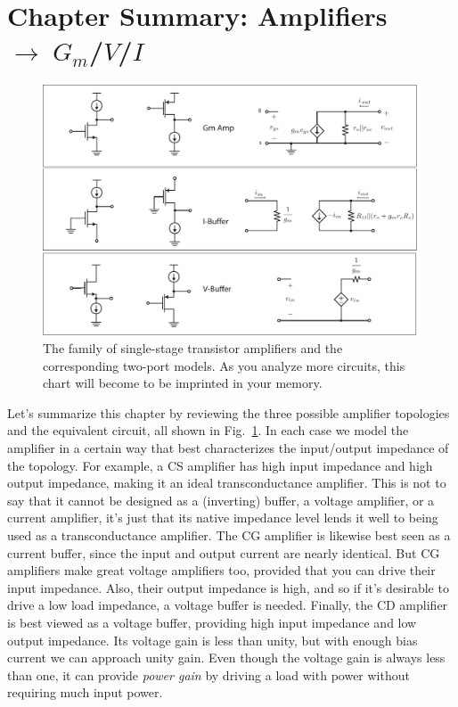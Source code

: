 \section{Chapter Summary: Amplifiers \texorpdfstring{$\rightarrow \; G_m$/$V$/$I$}{}}
\begin{figure}[tb]
\centering
\includegraphics[width=\columnwidth]{ampchart_models}
\caption{The family of single-stage transistor amplifiers and the corresponding two-port models.  As you analyze more circuits, this chart will become to be imprinted in your memory.}
\label{fig:ampchart_models}
\end{figure}
Let's summarize this chapter by reviewing the three possible amplifier topologies and the equivalent circuit, all shown in Fig.~\ref{fig:ampchart_models}.  In each case we model the amplifier in a certain way that best characterizes the input/output impedance of the topology.  For example, a CS amplifier has high input impedance and high output impedance, making it an ideal transconductance amplifier.  This is not to say that it cannot be designed as a (inverting) buffer, a voltage amplifier, or a current amplifier, it's just that its native impedance level lends it well to being used as a transconductance amplifier.  
The CG amplifier is likewise best seen as a current buffer, since the input and output current are nearly identical.  But CG amplifiers make great voltage amplifiers too, provided that you can drive their input impedance.  Also, their output impedance is high, and so if it's desirable to drive a low load impedance, a voltage buffer is needed.  
Finally, the CD amplifier is best viewed as a voltage buffer, providing high input impedance and low output impedance.  Its voltage gain is less than unity, but with enough bias current we can approach unity gain.  Even though the voltage gain is always less than one, it can provide \emph{power gain} by driving a load with power without requiring much input power.
